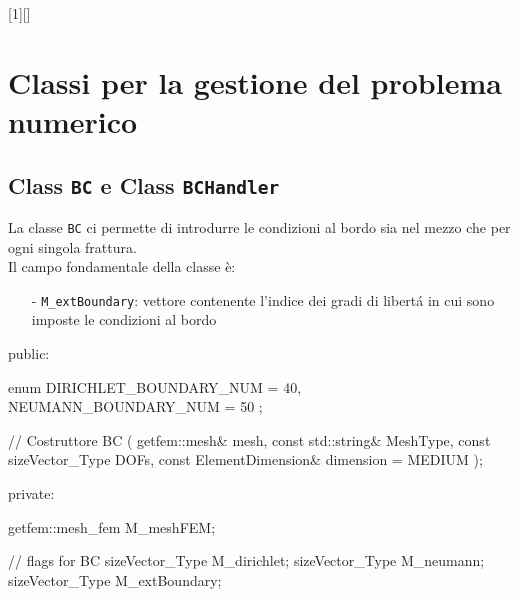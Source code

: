 [1][]{}{}

\chapter{Classi per la gestione del problema numerico}
\section{Class \texttt{BC} e Class \texttt{BCHandler}}
La classe \texttt{BC} ci permette di introdurre le condizioni al bordo sia nel mezzo che per ogni singola frattura. \\ 
Il campo fondamentale della classe \`{e}:
	\begin{enumerate}
	\item[-] \texttt{M\_extBoundary}: vettore contenente l'indice dei gradi di libert\'{a} in cui sono imposte le condizioni al bordo
	\end{enumerate} 

\begin{Code03_03}[caption={Classe \texttt{BC}}]
public:

    enum
    {
        DIRICHLET_BOUNDARY_NUM = 40,
        NEUMANN_BOUNDARY_NUM = 50
    };

    // Costruttore
    BC ( getfem::mesh& mesh,
         const std::string& MeshType,
         const sizeVector_Type DOFs,
         const ElementDimension& dimension = MEDIUM );

private:

    getfem::mesh_fem M_meshFEM;
    
    // flags for BC
    sizeVector_Type M_dirichlet;
    sizeVector_Type M_neumann;
    sizeVector_Type M_extBoundary;
\end{Code03_03}

